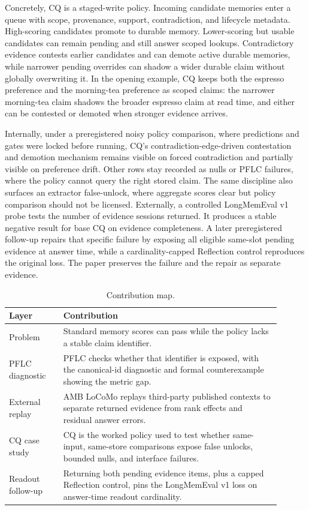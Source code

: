 Concretely, CQ is a staged-write policy. Incoming candidate memories enter a
queue with scope, provenance, support, contradiction, and lifecycle metadata.
High-scoring candidates promote to durable memory. Lower-scoring but usable
candidates can remain pending and still answer scoped lookups. Contradictory
evidence contests earlier candidates and can demote active durable memories,
while narrower pending overrides can shadow a wider durable claim without
globally overwriting it. In the opening example, CQ keeps both the espresso
preference and the morning-tea preference as scoped claims: the narrower
morning-tea claim shadows the broader espresso claim at read time, and either
can be contested or demoted when stronger evidence arrives.

Internally, under a preregistered noisy policy comparison, where predictions and
gates were locked before running, CQ's
contradiction-edge-driven contestation and demotion mechanism remains visible
on forced contradiction and partially visible on preference drift. Other rows
stay recorded as nulls or PFLC failures, where the policy cannot query the
right stored claim. The same discipline also surfaces an
extractor false-unlock, where aggregate scores clear but policy comparison
should not be licensed. Externally, a controlled LongMemEval v1 probe tests
the number of evidence sessions returned. It produces a stable negative result
for base CQ on evidence completeness. A later preregistered follow-up repairs
that specific failure by
exposing all eligible same-slot pending evidence at answer time,
while a cardinality-capped Reflection control reproduces the original loss. The
paper preserves the failure and the repair as separate evidence.

\begin{table}[H]
\centering
\caption{Contribution map.}
\label{tab:contribution-map}
\small
\begin{tabular}{p{0.18\linewidth} p{0.72\linewidth}}
\toprule
Layer & Contribution\\
\midrule
Problem & Standard memory scores can pass while the policy lacks a stable claim
identifier.\\
PFLC diagnostic & PFLC checks whether that identifier is exposed, with the
canonical-id diagnostic and formal counterexample showing the metric gap.\\
External replay & AMB LoCoMo replays third-party published contexts to separate
returned evidence from rank effects and residual answer errors.\\
CQ case study & CQ is the worked policy used to test whether
same-input, same-store comparisons expose false unlocks, bounded nulls, and
interface failures.\\
Readout follow-up & Returning both pending evidence items, plus a capped
Reflection control, pins the LongMemEval v1 loss on answer-time readout
cardinality.\\
\bottomrule
\end{tabular}
\end{table}

